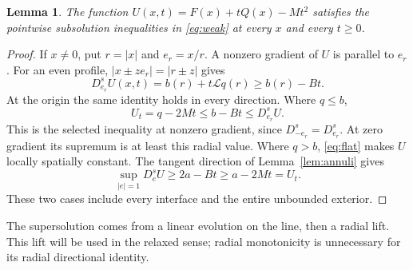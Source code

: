 \documentclass[11pt]{article}
\newtheorem{lemma}{Lemma}
\newcommand{\Lop}{\mathcal L}
\begin{document}
\begin{lemma}\label{lem:sub}
The function $U(x,t)=F(x)+tQ(x)-Mt^2$ satisfies the pointwise subsolution
inequalities in \eqref{eq:weak} at every $x$ and every $t\ge0$.
\end{lemma}
\begin{proof}
If $x\ne0$, put $r=|x|$ and $e_r=x/r$. A nonzero gradient of $U$ is
parallel to $e_r$. For an even profile, $|x\pm ze_r|=|r\pm z|$ gives
\begin{equation}\label{eq:radialU}
 D_{e_r}^sU(x,t)=b(r)+t\Lop q(r)\ge b(r)-Bt.
\end{equation}
At the origin the same identity holds in every direction. Where $q\le b$,
\[
 U_t=q-2Mt\le b-Bt\le D_{e_r}^sU.
\]
This is the selected inequality at nonzero gradient, since $D_{-e_r}^s=D_{e_r}^s$.
At zero gradient its supremum is at least this radial value.
Where $q>b$, \eqref{eq:flat} makes $U$ locally spatially constant.
The tangent direction of Lemma~\ref{lem:annuli} gives
\[
 \sup_{|e|=1}D_e^sU\ge2a-Bt\ge a-2Mt=U_t.
\]
These two cases include every interface and the entire unbounded exterior.
\end{proof}

The supersolution comes from a linear evolution on the line, then a radial
lift. This lift will be used in the relaxed sense; radial monotonicity is
unnecessary for its radial directional identity.
\end{document}
